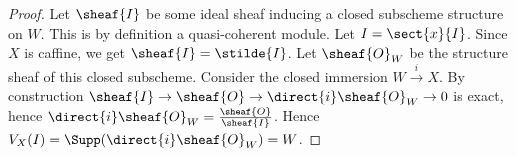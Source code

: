 \begin{proof}
Let $\sheaf{I}$ be some ideal sheaf inducing a closed subscheme structure on $W$.
This is by definition a quasi-coherent module.
Let $I = \sect{x}{I}$. 
Since $X$ is caffine, we get $\sheaf{I} = \stilde{I}$.
Let $\sheaf{O}_W$ be the structure sheaf of this closed subscheme. 
Consider the closed immersion $W\xrightarrow{i} X$.
By construction $\sheaf{I} \rightarrow \sheaf{O} \rightarrow \direct{i}\sheaf{O}_W \rightarrow 0$ is exact, hence $\direct{i}\sheaf{O}_W = \frac{\sheaf{O}}{\sheaf{I}}$.
Hence $V_X(I) = \Supp(\direct{i}\sheaf{O}_W) = W$.
\end{proof}